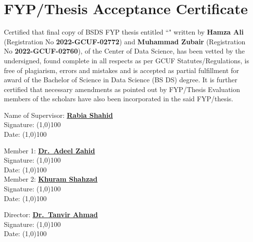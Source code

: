 \chapter*{FYP/Thesis Acceptance Certificate}

Certified that final copy of BSDS FYP thesis entitled ``\textbf{\fyptitle}" written by \textbf{Hamza Ali} (Registration No \textbf{2022-GCUF-02772}) and \textbf{Muhammad Zubair} (Registration No \textbf{2022-GCUF-02760}), of the Center of Data Science, has been vetted by the undersigned, found complete in all respects as per GCUF Statutes/Regulations, is free of plagiarism, errors and mistakes and is accepted as partial fulfillment for award of the Bachelor of Science in Data Science (BS DS) degree. It is further certified that necessary amendments as pointed out by FYP/Thesis Evaluation members of the scholars have also been incorporated in the said FYP/thesis.
        
    \begin{flushright}
    Name of Supervisor: \textbf{\underline{Rabia Shahid}}\\
    \vspace*{10pt}\noindent
    Signature: \line(1,0){100}\\
    \vspace*{10pt}\noindent
    Date: \line(1,0){100}
    
    Member 1: \textbf{\underline{Dr.\ Adeel Zahid}}\\
    \vspace*{10pt}\noindent
    Signature: \line(1,0){100}\\
    \vspace*{10pt}\noindent
    Date:  \line(1,0){100}\\[1em]
    Member 2: \textbf{\underline{Khuram Shahzad}}\\
    \vspace*{10pt}\noindent
    Signature: \line(1,0){100}\\
    \vspace*{10pt}\noindent
    Date:  \line(1,0){100}

    Director: \textbf{\underline{Dr.\ Tanvir Ahmad}}\\
    \vspace*{10pt}\noindent
    Signature: \line(1,0){100}\\
    \vspace*{10pt}\noindent
    Date:  \line(1,0){100}
    \end{flushright}
